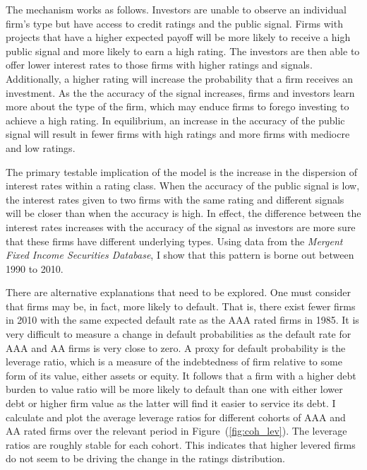 \documentclass[notitlepage]{article}
\begin{document}
The mechanism works as follows. Investors are unable to observe an individual firm's type but have access to credit ratings and the public signal. Firms with projects that have a higher expected payoff will be more likely to receive a high public signal and more likely to earn a high rating. The investors are then able to offer lower interest rates to those firms with higher ratings and signals. Additionally, a higher rating will increase the probability that a firm receives an investment. As the the accuracy of the signal increases, firms and investors learn more about the type of the firm, which may enduce firms to forego investing to achieve a high rating. In equilibrium, an increase in the accuracy of the public signal will result in fewer firms with high ratings and more firms with mediocre and low ratings.

The primary testable implication of the model is the increase in the dispersion of interest rates within a rating class. When the accuracy of the public signal is low, the interest rates given to two firms with the same rating and different signals will be closer than when the accuracy is high. In effect, the difference between the interest rates increases with the accuracy of the signal as investors are more sure that these firms have different underlying types. Using data from the \textit{Mergent Fixed Income Securities Database}, I show that this pattern is borne out between 1990 to 2010. 


There are alternative explanations that need to be explored. One must consider that firms may be, in fact, more likely to default. That is, there exist fewer firms in 2010 with the same expected default rate as the AAA rated firms in 1985. It is very difficult to measure a change in default probabilities as the default rate for AAA and AA firms is very close to zero. A proxy for default probability is the leverage ratio, which is a measure of the indebtedness of firm relative to some form of its value, either assets or equity. It follows that a firm with a higher debt burden to value ratio will be more likely to default than one with either lower debt or higher firm value as the latter will find it easier to service its debt. I calculate and plot the average leverage ratios for different cohorts of AAA and AA rated firms over the relevant period in Figure~(\ref{fig:coh_lev}). The leverage ratios are roughly stable for each cohort. This indicates that higher levered firms do not seem to be driving the change in the ratings distribution.
\end{document}
